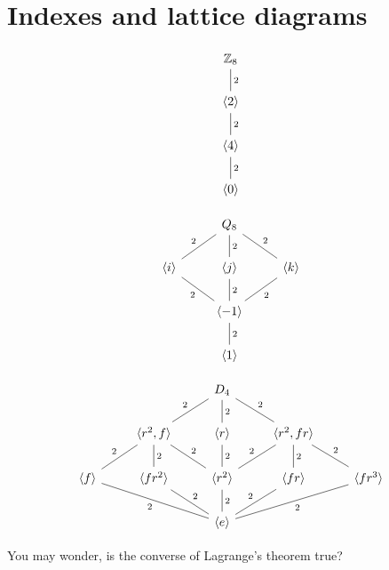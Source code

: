 \documentclass{ximera}
\begin{document}
\section{Indexes and lattice diagrams}


\[
\begin{tikzcd}
  \Z_8  \ar[d,-,"2"] \\
  \<2\> \ar[d,-,"2"] \\
  \<4\> \ar[d,-,"2"] \\   
  \<0\> 
\end{tikzcd}
\]

\[
\begin{tikzcd}
       & Q_8 \ar[rd,-,"2"] \ar[d,-,"2"] \ar[ld,-,"2",swap] &       \\
\<i\>  \ar[rd,-,"2",swap] & \<j\>  \ar[d,-,"2"]     & \<k\> \ar[ld,-,"2"]\\
&\< -1\> \ar[d,-,"2"]&        \\   
       & \<1\> &
\end{tikzcd}
\]


\[
\begin{tikzcd}
   &    & D_4 \ar[rd,-,"2"] \ar[d,-,"2"] \ar[ld,-,"2",swap] &       \\
&\<r^2,f\>  \ar[rd,-,"2"] \ar[d,-,"2"] \ar[ld,-,"2",swap]& \<r \>  \ar[d,-,"2"]     & \<r^2,fr\> \ar[ld,-,"2",swap] \ar[d,-,"2"] \ar[rd,-,"2"]\\
\<f\>\ar[rrd,-,"2",swap]& \<fr^2\> \ar[rd,-,"2"]&\< r^2\> \ar[d,-,"2"]  &   \<fr\> \ar[ld,-,"2",swap]& \<fr^3\>\ar[lld,-,"2"]     \\   
  &     & \<e\> &  &
\end{tikzcd}
\]













You may wonder, is the converse of Lagrange's theorem true?
\end{document}
